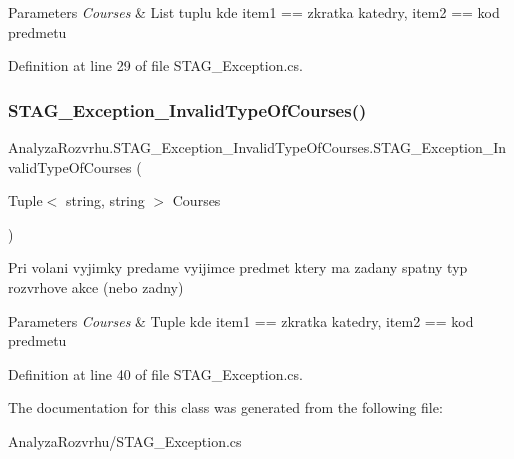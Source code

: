 \begin{DoxyParams}{Parameters}
{\em Courses} & List tuplu kde item1 == zkratka katedry, item2 == kod predmetu \\
\hline
\end{DoxyParams}


Definition at line 29 of file S\+T\+A\+G\+\_\+\+Exception.\+cs.

\mbox{\label{class_analyza_rozvrhu_1_1_s_t_a_g___exception___invalid_type_of_courses_aa50a18e4e4c24d67e8ee8d36809e4b41}} 
\subsubsection{\texorpdfstring{S\+T\+A\+G\+\_\+\+Exception\+\_\+\+Invalid\+Type\+Of\+Courses()}{STAG\_Exception\_InvalidTypeOfCourses()}\hspace{0.1cm}{\footnotesize\ttfamily [2/2]}}
{\footnotesize\ttfamily Analyza\+Rozvrhu.\+S\+T\+A\+G\+\_\+\+Exception\+\_\+\+Invalid\+Type\+Of\+Courses.\+S\+T\+A\+G\+\_\+\+Exception\+\_\+\+Invalid\+Type\+Of\+Courses (\begin{DoxyParamCaption}\item[{Tuple$<$ string, string $>$}]{Courses }\end{DoxyParamCaption})}



Pri volani vyjimky predame vyijimce predmet ktery ma zadany spatny typ rozvrhove akce (nebo zadny) 


\begin{DoxyParams}{Parameters}
{\em Courses} & Tuple kde item1 == zkratka katedry, item2 == kod predmetu \\
\hline
\end{DoxyParams}


Definition at line 40 of file S\+T\+A\+G\+\_\+\+Exception.\+cs.



The documentation for this class was generated from the following file\+:\begin{DoxyCompactItemize}
\item 
Analyza\+Rozvrhu/S\+T\+A\+G\+\_\+\+Exception.\+cs\end{DoxyCompactItemize}

